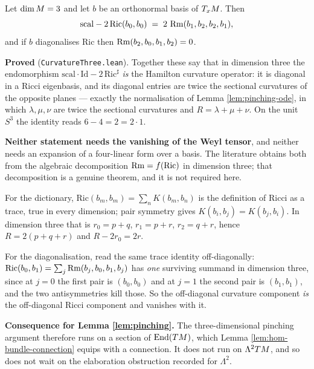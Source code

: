 \begin{lemma}
  \label{lem:curvature-three}
  \leanok
  Let $\dim M = 3$ and let $b$ be an orthonormal basis of $T_xM$. Then
  \[
    \mathrm{scal} - 2\,\mathrm{Ric}(b_0,b_0) \;=\; 2\,\operatorname{Rm}(b_1,b_2,b_2,b_1),
  \]
  and if $b$ diagonalises $\mathrm{Ric}$ then $\operatorname{Rm}(b_2,b_0,b_1,b_2) = 0$.

  \textbf{Proved} (\texttt{CurvatureThree.lean}). Together these say that in dimension three
  the endomorphism $\mathrm{scal}\cdot\mathrm{Id} - 2\,\mathrm{Ric}^\sharp$ \emph{is} the
  Hamilton curvature operator: it is diagonal in a Ricci eigenbasis, and its diagonal entries
  are twice the sectional curvatures of the opposite planes --- exactly the normalisation of
  Lemma \ref{lem:pinching-ode}, in which $\lambda,\mu,\nu$ are twice the sectional curvatures
  and $R = \lambda+\mu+\nu$. On the unit $S^3$ the identity reads $6 - 4 = 2 = 2\cdot 1$.

  \textbf{Neither statement needs the vanishing of the Weyl tensor}, and neither needs an
  expansion of a four-linear form over a basis. The literature obtains both from the
  algebraic decomposition $\operatorname{Rm} = f(\mathrm{Ric})$ in dimension three; that decomposition is a
  genuine theorem, and it is not required here.

  For the dictionary, $\mathrm{Ric}(b_m,b_m) = \sum_n K(b_m,b_n)$ is the definition of Ricci
  as a trace, true in every dimension; pair symmetry gives $K(b_i,b_j) = K(b_j,b_i)$. In
  dimension three that is $r_0 = p+q$, $r_1 = p+r$, $r_2 = q+r$, hence $R = 2(p+q+r)$ and
  $R - 2r_0 = 2r$.

  For the diagonalisation, read the same trace identity off-diagonally:
  $\mathrm{Ric}(b_0,b_1) = \sum_j \operatorname{Rm}(b_j,b_0,b_1,b_j)$ has \emph{one} surviving summand in
  dimension three, since at $j=0$ the first pair is $(b_0,b_0)$ and at $j=1$ the second pair
  is $(b_1,b_1)$, and the two antisymmetries kill those. So the off-diagonal curvature
  component \emph{is} the off-diagonal Ricci component and vanishes with it.

  \textbf{Consequence for Lemma \ref{lem:pinching}.} The three-dimensional pinching argument
  therefore runs on a section of $\mathrm{End}(TM)$, which Lemma
  \ref{lem:hom-bundle-connection} equips with a connection. It does not run on
  $\Lambda^2 TM$, and so does not wait on the elaboration obstruction recorded for
  $\Lambda^2$.
\end{lemma}

